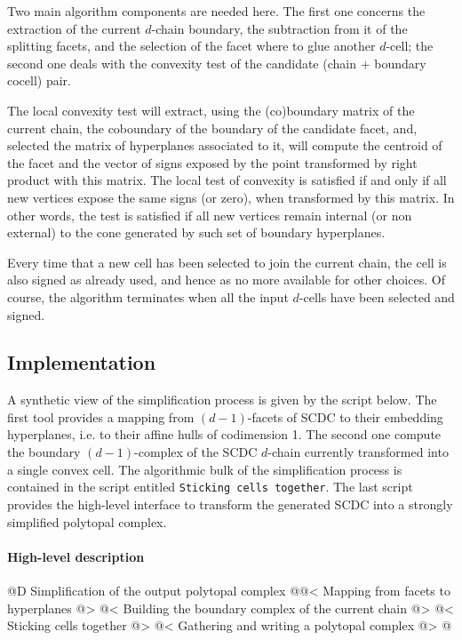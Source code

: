 \documentclass[11pt,oneside]{article}	%
\begin{document}
Two main algorithm components are needed here. The first one concerns the extraction of the current $d$-chain boundary, the subtraction from it of the splitting facets, and the selection of the facet where to glue another $d$-cell; the second one deals with the convexity test of the candidate (chain $+$ boundary cocell) pair.

The local convexity test will extract, using the (co)boundary matrix of the current chain, the coboundary of the boundary of the candidate facet, and, selected the matrix of hyperplanes associated to it, will compute the centroid of the facet and the vector of signs exposed by the point transformed by right product with this matrix. The local test of convexity is satisfied if and only if all new vertices expose the same signs (or zero), when transformed by this matrix. In other words, the test is satisfied  if all new vertices remain internal (or non external) to the cone generated by such set of boundary hyperplanes.

Every time that a new cell has been selected to join the current chain, the cell is also signed as already used, and hence as no more available for other choices. Of course, the algorithm terminates when all the input  $d$-cells have been selected and signed.


\subsection{Implementation}
A synthetic view of the simplification process is given by the script below.
The first tool provides a mapping from $(d-1)$-facets of SCDC to their embedding hyperplanes, i.e. to their affine hulls of codimension 1. The second one compute the boundary $(d-1)$-complex of the SCDC $d$-chain currently transformed into a single convex cell. The algorithmic bulk of the simplification process is contained in the script entitled \texttt{Sticking cells together}. The last script provides the high-level interface to transform the generated SCDC into a strongly simplified polytopal complex.

\paragraph{High-level description}

@D Simplification of the output polytopal complex
@{@< Mapping from facets to hyperplanes @>
@< Building the boundary complex of the current chain @>
@< Sticking cells together @>
@< Gathering and writing a polytopal complex @>
@}
\end{document}
